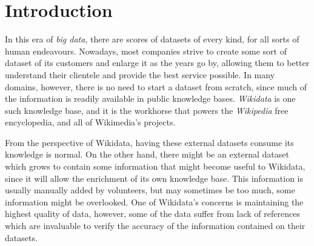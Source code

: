 \documentclass[epsfig,a4paper,11pt,titlepage,twoside,openany]{book}
\begin{document}
      



\chapter{Introduction}
\label{chap:introduction}

In this era of \textit{big data}, there are scores of datasets of every kind, for all sorts of human endeavours. Nowadays, most companies strive to create some sort of dataset of its customers and enlarge it as the years go by, allowing them to better understand their clientele and provide the best service possible. In many domains, however, there is no need to start a dataset from scratch, since much of the information is readily available in public knowledge bases. \textit{Wikidata} is one such knowledge base, and it is the workhorse that powers the \textit{Wikipedia} free encyclopedia, and all of Wikimedia's projects.

From the perspective of Wikidata, having these external datasets consume its knowledge is normal. On the other hand, there might be an external dataset which grows to contain some information that might become useful to Wikidata, since it will allow the enrichment of its own knowledge base. This information is usually manually added by volunteers, but may sometimes be too much, some information might be overlooked. One of Wikidata's concerns is maintaining the highest quality of data, however, some of the data suffer from lack of references which are invaluable to verify the accuracy of the information contained on their datasets.
\end{document}
